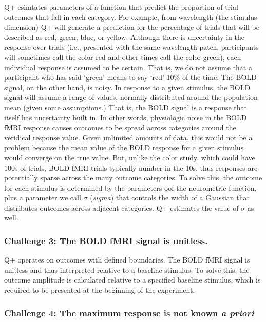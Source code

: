 \documentclass[
  man,floatsintext]{apa6}
\begin{document}
Q+ esimtates parameters of a function that predict the proportion of trial outcomes that fall in each category. For example, from wavelength (the stimulus dimension) Q+ will generate a prediction for the percentage of trials that will be described as red, green, blue, or yellow. Although there is uncertainty in the response over trials (i.e., presented with the same wavelength patch, participants will sometimes call the color red and other times call the color green), each individual response is assumed to be certain. That is, we do not assume that a participant who has said `green' means to say `red' 10\% of the time. The BOLD signal, on the other hand, is noisy. In response to a given stimulus, the BOLD signal will assume a range of values, normally distributed around the population mean (given some assumptions.) That is, the BOLD signal is a response that itself has uncertainty built in. In other words, physiologic noise in the BOLD fMRI response causes outcomes to be spread across categories around the veridical response value. Given unlimited amounts of data, this would not be a problem because the mean value of the BOLD response for a given stimulus would converge on the true value. But, unlike the color study, which could have 100s of trials, BOLD fMRI trials typically number in the 10s, thus responses are potentially sparse across the many outcome categories. To solve this, the outcome for each stimulus is determined by the parameters oof the neurometric function, plus a parameter we call \(\sigma\) (\emph{sigma}) that controls the width of a Gaussian that distributes outcomes across adjacent categories. Q+ estimates the value of \(\sigma\) as well.

\hypertarget{challenge-3-the-bold-fmri-signal-is-unitless.}{%
\subsubsection{Challenge 3: The BOLD fMRI signal is unitless.}\label{challenge-3-the-bold-fmri-signal-is-unitless.}}

Q+ operates on outcomes with defined boundaries. The BOLD fMRI signal is unitless and thus interpreted relative to a baseline stimulus. To solve this, the outcome amplitude is calculated relative to a specified baseline stimulus, which is required to be presented at the beginning of the experiment.

\hypertarget{challenge-4-the-maximum-response-is-not-known-a-priori}{%
\subsubsection{\texorpdfstring{Challenge 4: The maximum response is not known \emph{a priori}}{Challenge 4: The maximum response is not known a priori}}\label{challenge-4-the-maximum-response-is-not-known-a-priori}}
\end{document}
